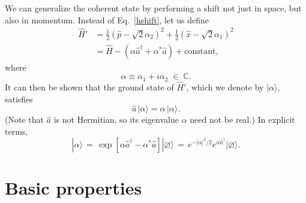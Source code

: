 \documentclass[prx,12pt]{revtex4-2}
\begin{document}
We can generalize the coherent state by performing a shift not just in
space, but also in momentum.  Instead of Eq.~\eqref{hshift}, let us
define
\begin{align}
  \hat{H}' &= \frac{1}{2}\left(\hat{p} - \sqrt{2}\alpha_2\right)^2
  + \frac{1}{2}\left(\hat{x} - \sqrt{2}\alpha_1\right)^2 \\
  &= \hat{H} - \left(\alpha \hat{a}^\dagger + \alpha^*\hat{a}\right)
  + \textrm{constant},
\end{align}
where
\begin{equation}
  \alpha \equiv \alpha_1 + i \alpha_2 \;\in \;\mathbb{C}.
\end{equation}
It can then be shown that the ground state of $\hat{H}'$, which we
denote by $|\alpha\rangle$, satisfies
\begin{equation}
  \hat{a} \, |\alpha\rangle = \alpha \,|\alpha\rangle.
  \label{aaction}
\end{equation}
(Note that $\hat{a}$ is not Hermitian, so its eigenvalue $\alpha$ need
not be real.)  In explicit terms,
\begin{equation}
  |\alpha\rangle
  \,=\, \exp\left[\alpha\hat{a}^\dagger - \alpha^*\hat{a}\right] |\varnothing\rangle
  \,=\, e^{-|\alpha|^2/2} e^{\alpha\hat{a}^\dagger} |\varnothing\rangle.
  \label{alphaexp}
\end{equation}

\section{Basic properties}
\end{document}
